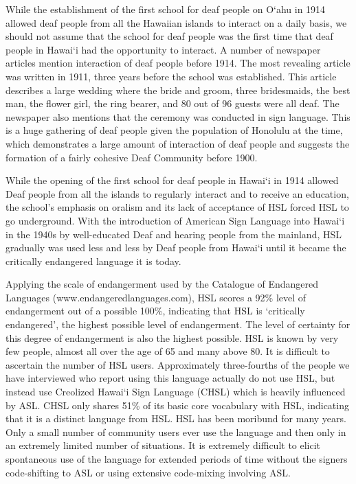 \documentclass{tufte-book}
\begin{document}
While the establishment of the first school for deaf people on O‘ahu in 1914 allowed deaf people from all the Hawaiian islands to interact on a daily basis, we should not assume that the school for deaf people was the first time that deaf people in Hawai‘i had the opportunity to interact. A number of newspaper articles mention interaction of deaf people before 1914. The most revealing article was written in 1911, three years before the school was established. This article describes a large wedding where the bride and groom, three bridesmaids, the best man, the flower girl, the ring bearer, and 80 out of 96 guests were all deaf. The newspaper also mentions that the ceremony was conducted in sign language. This is a huge gathering of deaf people given the population of Honolulu at the time, which demonstrates a large amount of interaction of deaf people and suggests the  formation of a fairly cohesive Deaf Community before 1900.

While the opening of the first school for deaf people in Hawai‘i in 1914 allowed Deaf people from all the islands to regularly interact and to receive an education, the school’s emphasis on oralism and its lack of acceptance of HSL forced HSL to go underground. With the introduction of American Sign Language into Hawai‘i in the 1940s by well-educated Deaf and hearing people from the mainland, HSL gradually was used less and less by Deaf people from Hawai‘i until it became the critically endangered language it is today.



Applying the scale of endangerment used by the Catalogue of Endangered Languages (www.endangeredlanguages.com), HSL scores a 92\% level of endangerment out of a possible 100\%, indicating that HSL is `critically endangered', the highest possible level of endangerment. The level of certainty for this degree of endangerment is also the highest possible. HSL is known by  very few people, almost all over the age of 65 and many above  80. It is difficult to ascertain the number of HSL users. Approximately three-fourths of the people we have interviewed who report  using     this language actually do not use HSL, but instead use Creolized Hawai`i Sign Language (CHSL) which is heavily influenced by ASL. CHSL only shares 51\% of its basic core vocabulary with HSL, indicating that it is a distinct language from HSL. HSL has been moribund for many years. Only a small number of community users ever use the language and then only in an extremely limited number of situations. It is extremely difficult to elicit spontaneous use of the language for extended periods of time without the signers code-shifting to ASL or using extensive code-mixing involving ASL.
\end{document}
